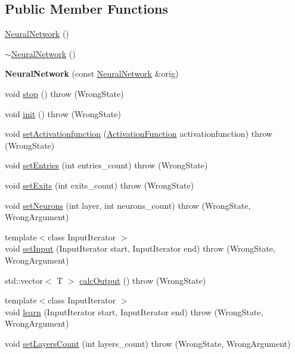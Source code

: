 \subsection*{\-Public \-Member \-Functions}
\begin{DoxyCompactItemize}
\item 
\hyperlink{class_neural_network_ade5d1724706351407fdf6acf613ac8c8}{\-Neural\-Network} ()
\item 
\hyperlink{class_neural_network_a4c1e3cc6dc0114260c17f0a5ea8e9981}{$\sim$\-Neural\-Network} ()
\item 
\hypertarget{class_neural_network_a4ce7e819f755461926a92668aab811e2}{{\bfseries \-Neural\-Network} (const \hyperlink{class_neural_network}{\-Neural\-Network} \&orig)}\label{class_neural_network_a4ce7e819f755461926a92668aab811e2}

\item 
void \hyperlink{class_neural_network_aaf6e7c89c53dcc4f4b2c71f8d25a9741}{stop} ()  throw (\-Wrong\-State)
\item 
void \hyperlink{class_neural_network_aa83131836c86cd3e60ddb46a17b164a5}{init} ()  throw (\-Wrong\-State)
\item 
void \hyperlink{class_neural_network_acfdd9905e047fff1b40e4cd358160f6e}{set\-Activationfunction} (\hyperlink{class_activation_function}{\-Activation\-Function} activationfunction)  throw (\-Wrong\-State)
\item 
void \hyperlink{class_neural_network_a705286b62e4d1d11310f997dadd31fa8}{set\-Entries} (int entries\-\_\-count)  throw (\-Wrong\-State)
\item 
void \hyperlink{class_neural_network_a18912fbb8068bfb301d6e2462c9f8a31}{set\-Exits} (int exits\-\_\-count)  throw (\-Wrong\-State)
\item 
void \hyperlink{class_neural_network_ab3c70e006390624a5b9bd2c933b8af56}{set\-Neurons} (int layer, int neurons\-\_\-count)  throw (\-Wrong\-State, Wrong\-Argument)
\item 
{\footnotesize template$<$class Input\-Iterator $>$ }\\void \hyperlink{class_neural_network_aaf64536a908b15b76faa8e19216d9219}{set\-Input} (\-Input\-Iterator start, \-Input\-Iterator end)  throw (\-Wrong\-State, Wrong\-Argument)
\item 
std\-::vector$<$ \-T $>$ \hyperlink{class_neural_network_af7c28ad226f6d32d8c578159f0d03ae9}{calc\-Output} ()  throw (\-Wrong\-State)
\item 
{\footnotesize template$<$class Input\-Iterator $>$ }\\void \hyperlink{class_neural_network_a814f14ae36ecb286923f7fff6cff7aa7}{learn} (\-Input\-Iterator start, \-Input\-Iterator end)  throw (\-Wrong\-State, Wrong\-Argument)
\item 
void \hyperlink{class_neural_network_a3ef0490ade6f9efff49501132a12fd18}{set\-Layers\-Count} (int layers\-\_\-count)  throw (\-Wrong\-State, Wrong\-Argument)
\end{DoxyCompactItemize}


